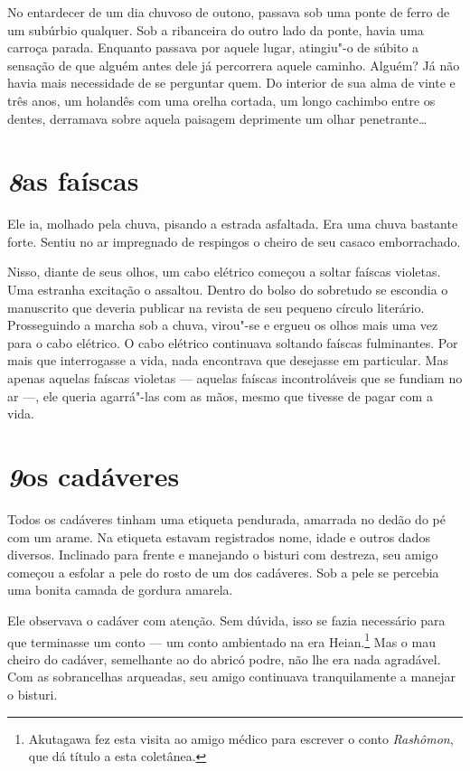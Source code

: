 No entardecer de um dia chuvoso de outono, passava sob uma ponte de
ferro de um subúrbio qualquer. Sob a ribanceira do outro lado da ponte,
havia uma carroça parada. Enquanto passava por aquele lugar, atingiu"-o
de súbito a sensação de que alguém antes dele já percorrera aquele
caminho. Alguém? Já não havia mais necessidade de se perguntar quem. Do
interior de sua alma de vinte e três anos, um holandês com uma orelha
cortada, um longo cachimbo entre os dentes, derramava sobre aquela
paisagem deprimente um olhar penetrante\ldots{}

\section*{\textit{8}\es as faíscas}

Ele ia, molhado pela chuva, pisando a estrada asfaltada. Era uma chuva
bastante forte. Sentiu no ar impregnado de respingos o cheiro de seu
casaco emborrachado.

Nisso, diante de seus olhos, um cabo elétrico começou a soltar faíscas
violetas. Uma estranha excitação o assaltou. Dentro do bolso do
sobretudo se escondia o manuscrito que deveria publicar na revista de
seu pequeno círculo literário. Prosseguindo a marcha sob a chuva,
virou"-se e ergueu os olhos mais uma vez para o cabo elétrico. O cabo
elétrico continuava soltando faíscas fulminantes. Por mais que
interrogasse a vida, nada encontrava que desejasse em particular. Mas
apenas aquelas faíscas violetas --- aquelas faíscas incontroláveis que se
fundiam no ar ---, ele queria agarrá"-las com as mãos, mesmo que tivesse
de pagar com a vida.

\section*{\textit{9}\es os cadáveres}

Todos os cadáveres tinham uma etiqueta pendurada, amarrada no dedão do
pé com um arame. Na etiqueta estavam registrados nome, idade e outros
dados diversos. Inclinado para frente e manejando o bisturi com
destreza, seu amigo começou a esfolar a pele do rosto de um dos
cadáveres. Sob a pele se percebia uma bonita camada de gordura amarela.

Ele observava o cadáver com atenção. Sem dúvida, isso se fazia
necessário para que terminasse um conto --- um conto ambientado na era
Heian.\footnote{ Akutagawa fez esta visita ao amigo médico para escrever
o conto \textit{Rashômon}, que dá título a esta coletânea.} Mas o mau cheiro
do cadáver, semelhante ao do abricó podre, não lhe era nada agradável.
Com as sobrancelhas arqueadas, seu amigo continuava tranquilamente a
manejar o bisturi.

